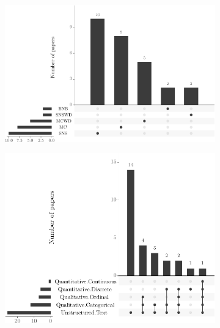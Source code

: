 \begin{figure}[!htp]
  \begin{subfigure}{.49\textwidth}
    \centering
    \includegraphics[width=\textwidth]{figures/distribution-by-problem-category-in-ups.pdf}
    \caption{}
    \label{fig:distribution_by_problem-category_in_ups}
  \end{subfigure}\hfill
  \begin{subfigure}{.49\textwidth}
    \centering
    \includegraphics[width=\textwidth]{figures/distribution-by-feature-category-in-ups.pdf}
    \caption{}
    \label{fig:distribution_by_feature_category} 
  \end{subfigure}\hfill
  \begin{subfigure}{.49\textwidth}
    \centering

\end{subfigure}
\end{figure}
